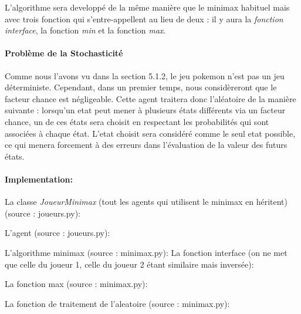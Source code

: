     			L'algorithme sera developpé de la même manière que le minimax habituel mais avec trois fonction qui s'entre-appellent au lieu de deux : il y aura la \emph{fonction interface}, la fonction \emph{min} et la fonction \emph{max}.
			\paragraph{Problème de la Stochasticité}
			    Comme nous l'avons vu dans la section 5.1.2, le jeu pokemon n'est pas un jeu déterministe. Cependant, dans un premier temps, nous considèreront que le facteur chance est négligeable. Cette agent traitera donc l'aléatoire de la manière suivante : lorsqu'un etat peut mener à plusieurs états différents via un facteur chance, un de ces états sera choisit en respectant les probabilités qui sont associées à chaque état. L'etat choisit sera considéré comme le seul etat possible, ce qui menera forcement à des erreurs dans l'évaluation de la valeur des futurs états.
            \paragraph{Implementation:}
                
                La classe \emph{JoueurMinimax} (tout les agents qui utilisent le minimax en héritent)(source : joueurs.py):
                
                
                
                L'agent (source : joueurs.py):
                
                
                
                L'algorithme minimax (source : minimax.py): 
                \smallskip
				La fonction interface (on ne met que celle du joueur 1, celle du joueur 2 étant similaire mais inversée):
					    
					    
				La fonction max (source : minimax.py): 
					    
				\smallskip
				La fonction de traitement de l'aleatoire (source : minimax.py): 
				
